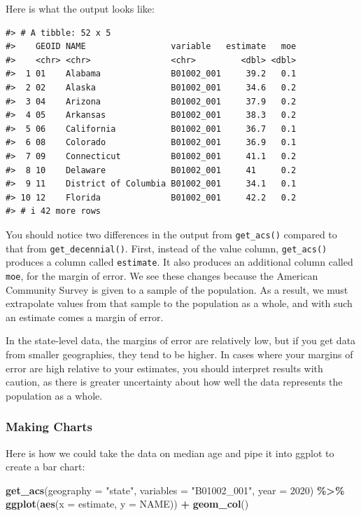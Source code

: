 \documentclass[
]{book}
\newenvironment{Shaded}{\begin{snugshade}}{\end{snugshade}}
\newcommand{\AttributeTok}[1]{\textcolor[rgb]{0.13,0.29,0.53}{#1}}
\newcommand{\DecValTok}[1]{\textcolor[rgb]{0.00,0.00,0.81}{#1}}
\newcommand{\FunctionTok}[1]{\textcolor[rgb]{0.13,0.29,0.53}{\textbf{#1}}}
\newcommand{\NormalTok}[1]{#1}
\newcommand{\SpecialCharTok}[1]{\textcolor[rgb]{0.81,0.36,0.00}{\textbf{#1}}}
\newcommand{\StringTok}[1]{\textcolor[rgb]{0.31,0.60,0.02}{#1}}
\begin{document}
Here is what the output looks like:

\begin{verbatim}
#> # A tibble: 52 x 5
#>    GEOID NAME                 variable   estimate   moe
#>    <chr> <chr>                <chr>         <dbl> <dbl>
#>  1 01    Alabama              B01002_001     39.2   0.1
#>  2 02    Alaska               B01002_001     34.6   0.2
#>  3 04    Arizona              B01002_001     37.9   0.2
#>  4 05    Arkansas             B01002_001     38.3   0.2
#>  5 06    California           B01002_001     36.7   0.1
#>  6 08    Colorado             B01002_001     36.9   0.1
#>  7 09    Connecticut          B01002_001     41.1   0.2
#>  8 10    Delaware             B01002_001     41     0.2
#>  9 11    District of Columbia B01002_001     34.1   0.1
#> 10 12    Florida              B01002_001     42.2   0.2
#> # i 42 more rows
\end{verbatim}

You should notice two differences in the output from \texttt{get\_acs()} compared to that from \texttt{get\_decennial()}. First, instead of the value column, \texttt{get\_acs()} produces a column called \texttt{estimate}. It also produces an additional column called \texttt{moe}, for the margin of error. We see these changes because the American Community Survey is given to a sample of the population. As a result, we must extrapolate values from that sample to the population as a whole, and with such an estimate comes a margin of error.

In the state-level data, the margins of error are relatively low, but if you get data from smaller geographies, they tend to be higher. In cases where your margins of error are high relative to your estimates, you should interpret results with caution, as there is greater uncertainty about how well the data represents the population as a whole.

\hypertarget{making-charts}{%
\subsubsection*{Making Charts}\label{making-charts}}

Here is how we could take the data on median age and pipe it into ggplot to create a bar chart:

\begin{Shaded}
\begin{Highlighting}[]
\FunctionTok{get\_acs}\NormalTok{(}\AttributeTok{geography =} \StringTok{"state"}\NormalTok{,}
        \AttributeTok{variables =} \StringTok{"B01002\_001"}\NormalTok{,}
        \AttributeTok{year =} \DecValTok{2020}\NormalTok{) }\SpecialCharTok{\%\textgreater{}\%} 
  \FunctionTok{ggplot}\NormalTok{(}\FunctionTok{aes}\NormalTok{(}\AttributeTok{x =}\NormalTok{ estimate,}
             \AttributeTok{y =}\NormalTok{ NAME)) }\SpecialCharTok{+}
  \FunctionTok{geom\_col}\NormalTok{()}
\end{Highlighting}
\end{Shaded}
\end{document}
